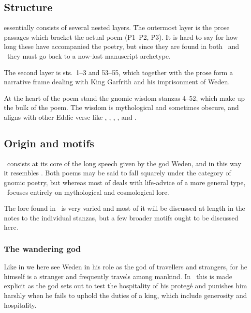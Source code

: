 \subsection{Structure}

 essentially consists of several nested layers.  The outermost layer is the prose passages which bracket the actual poem (P1--P2, P3).  It is hard to say for how long these have accompanied the poetry, but since they are found in both \Regius\ and \AM\ they must go back to a now-lost manuscript archetype.

The second layer is sts.~1--3 and 53--55, which together with the prose form a narrative frame dealing with King Garfrith and his imprisonment of Weden.

At the heart of the poem stand the gnomic wisdom stanzas 4--52, which make up the bulk of the poem.  The wisdom is mythological and sometimes obscure, and aligns with other Eddic verse like , , , , and .

\subsection{Origin and motifs}

\Grimnismal\ consists at its core of the long speech given by the god Weden, and in this way it resembles .  Both poems may be said to fall squarely under the category of gnomic poetry, but whereas most of  deals with life-advice of a more general type, \Grimnismal\ focuses entirely on mythological and cosmological lore.

The lore found in \Grimnismal\ is very varied and most of it will be discussed at length in the notes to the individual stanzas, but a few broader motifs ought to be discussed here.

\subsubsection{The wandering god}

Like in  we here see Weden in his role as the god of travellers and strangers, for he himself is a stranger and frequently travels among mankind.  In \Grimnismal\ this is made explicit as the god sets out to test the hospitality of his protegé and punishes him harshly when he fails to uphold the duties of a king, which include generosity and hospitality.

